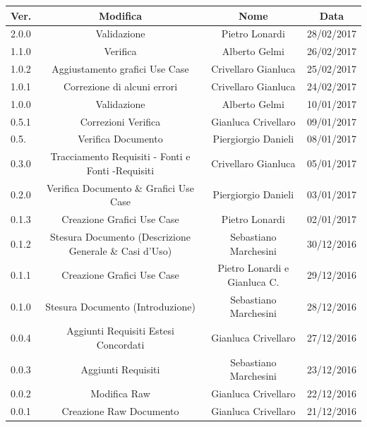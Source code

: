 \documentclass[12pt,a4paper,titlepage]{article}
\begin{document}
		{\renewcommand\arraystretch{1.2}  %
		\begin{tabular}{|l|c|c|c|}
			\hline
			{\textbf{Ver.}}&{\textbf{Modifica}}&{\textbf{Nome}}&{\textbf{Data}}\\
			\hline
			2.0.0 & Validazione & Pietro Lonardi & 28/02/2017\\
			\hline
			1.1.0 & Verifica &  Alberto Gelmi & 26/02/2017 \\
			\hline
			1.0.2 & Aggiustamento grafici Use Case & Crivellaro Gianluca & 25/02/2017 \\
			\hline
			1.0.1 &	Correzione di alcuni errori & Crivellaro Gianluca & 24/02/2017 \\
			\hline
			1.0.0 & Validazione & Alberto Gelmi & 10/01/2017\\
			\hline
			0.5.1 & Correzioni Verifica & Gianluca Crivellaro & 09/01/2017  \\
			\hline
			0.5. & Verifica Documento & Piergiorgio Danieli & 08/01/2017 \\
			\hline
			0.3.0 & Tracciamento Requisiti - Fonti e Fonti -Requisiti & Crivellaro Gianluca & 05/01/2017 \\
			\hline
			0.2.0 & Verifica Documento \& Grafici Use Case & Piergiorgio Danieli & 03/01/2017 \\
			\hline
			0.1.3 & Creazione Grafici Use Case & Pietro Lonardi & 02/01/2017 \\
			\hline
			0.1.2 & Stesura Documento (Descrizione Generale \& Casi d'Uso) & Sebastiano Marchesini & 30/12/2016  \\	
			\hline
			0.1.1 & Creazione Grafici Use Case & Pietro Lonardi e Gianluca C. & 29/12/2016  \\
			\hline
			0.1.0 & Stesura Documento (Introduzione) & Sebastiano Marchesini &  28/12/2016  \\
			\hline
			0.0.4 & Aggiunti Requisiti Estesi Concordati & Gianluca Crivellaro & 27/12/2016  \\
			\hline
			0.0.3 & Aggiunti Requisiti & Sebastiano Marchesini & 23/12/2016  \\
			\hline
			0.0.2 & Modifica Raw & Gianluca Crivellaro & 22/12/2016  \\
			\hline
			0.0.1 & Creazione Raw Documento & Gianluca Crivellaro & 21/12/2016  \\
			\hline
		\end{tabular}
	}	\normalsize
	\newpage
	\tableofcontents
	\thispagestyle{empty}
	
	\newpage
	
\end{document}
